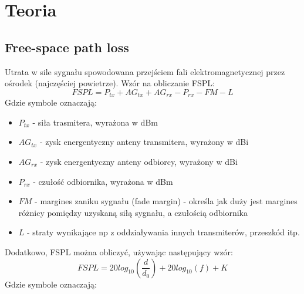 \documentclass{article}
\date{2016-10-31}
\author{Szymon Nowak}
\begin{document}
  \section{Teoria}
	  \subsection{Free-space path loss}		  		  
		  Utrata w sile sygnału spowodowana przejściem fali elektromagnetycznej przez ośrodek (najczęściej powietrze).
		  Wzór na obliczanie FSPL:
		  \begin{equation}
			  FSPL = P_{tx} + AG_{tx} + AG_{rx} - P_{rx} - FM - L
		  \end{equation}
		  Gdzie symbole oznaczają:
		  \begin{itemize}
		  	\item $P_{tx}$ - siła trasmitera, wyrażona w dBm
		  	\item $AG_{tx}$ - zysk energentyczny anteny transmitera, wyrażony w dBi
		  	\item $AG_{rx}$ - zysk energentyczny anteny odbiorcy, wyrażony w dBi
		  	\item $P_{rx}$ - czułość odbiornika, wyrażona w dBm
		  	\item $FM$ - margines zaniku sygnału (fade margin) - określa jak duży jest margines różnicy pomiędzy uzyskaną siłą sygnału, a czułością odbiornika
		  	\item $L$ - straty wynikające np z oddziaływania innych transmiterów, przeszkód itp.
		  \end{itemize}
		  Dodatkowo, FSPL można obliczyć, używając następujący wzór:
		  \begin{equation}
			  FSPL = 20log_{10}\left(\frac{d}{d_{0}}\right) + 20log_{10}(f) + K
		  \end{equation}
		  Gdzie symbole oznaczają:
\end{document}
